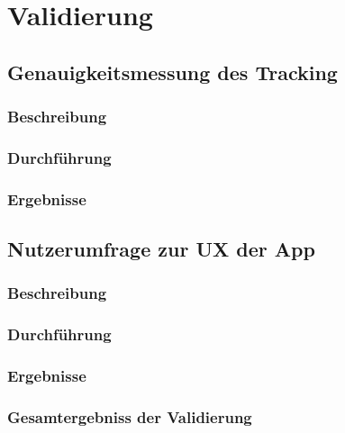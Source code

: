\chapter{Validierung}


\section{Genauigkeitsmessung des Tracking}

\subsection{Beschreibung}

\subsection{Durchführung}

\subsection{Ergebnisse}


\section{Nutzerumfrage zur UX der App}

\subsection{Beschreibung}

\subsection{Durchführung}

\subsection{Ergebnisse}


\subsection{Gesamtergebniss der Validierung}